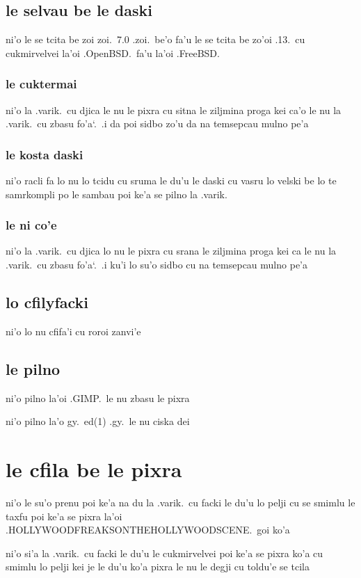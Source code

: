 \documentclass{report}
\newcommand\sds{\spacefactor\sfcode`.\ \space}
\begin{document}
\subsection{le selvau be le daski}
ni'o le se tcita be zoi zoi.\ 7.0 .zoi.\ be'o fa'u le se tcita be zo'oi .13.\ cu cukmirvelvei la'oi .OpenBSD.\ fa'u la'oi .FreeBSD.

\subsubsection{le cuktermai}
ni'o la .varik.\ cu djica le nu le pixra cu sitna le ziljmina proga kei ca'o le nu la .varik.\ cu zbasu fo'a\sds  .i da poi sidbo zo'u da na temsepcau mulno pe'a

\subsubsection{le kosta daski}
ni'o racli fa lo nu lo tcidu cu sruma le du'u le daski cu vasru lo velski be lo te samrkompli po le sambau poi ke'a se pilno la .varik.

\subsubsection{le ni co'e}
ni'o la .varik.\ cu djica lo nu le pixra cu srana le ziljmina proga kei ca le nu la .varik.\ cu zbasu fo'a\sds  .i ku'i lo su'o sidbo cu na temsepcau mulno pe'a

\subsection{lo cfilyfacki}
ni'o lo nu cfifa'i cu roroi zanvi'e

\subsection{le pilno}
ni'o pilno la'oi .GIMP.\ le nu zbasu le pixra

ni'o pilno la'o gy.\ ed(1) .gy.\ le nu ciska dei

\section{le cfila be le pixra}
ni'o le su'o prenu poi ke'a na du la .varik.\ cu facki le du'u lo pelji cu se smimlu le taxfu poi ke'a se pixra la'oi .HOLLYWOODFREAKSONTHEHOLLYWOODSCENE.\ goi ko'a

ni'o si'a la .varik.\ cu facki le du'u le cukmirvelvei poi ke'a se pixra ko'a cu smimlu lo pelji kei je le du'u ko'a pixra le nu le degji cu toldu'e se tcila
\end{document}
